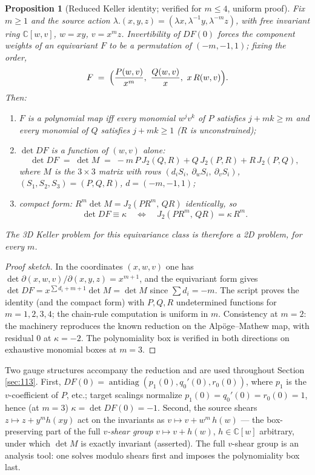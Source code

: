 \documentclass[11pt]{article}
\newtheorem{proposition}[theorem]{Proposition}
\theoremstyle{definition}
\theoremstyle{remark}
\newcommand{\C}{\mathbb{C}}
\DeclareMathOperator{\antidiag}{antidiag}
\begin{document}
\begin{proposition}[Reduced Keller identity; verified for $m\le 4$,
uniform proof]\label{prop:redw}
Fix $m \ge 1$ and the source action
$\lambda.(x,y,z) = (\lambda x, \lambda^{-1}y, \lambda^{-m}z)$, with free
invariant ring $\C[w,v]$, $w = xy$, $v = x^m z$. Invertibility of
$DF(0)$ forces the component weights of an equivariant $F$ to be a
permutation of $(-m,-1,1)$; fixing the order,
\[
F \;=\; \Bigl(\frac{P(w,v)}{x^{m}},\ \frac{Q(w,v)}{x},\ x\,R(w,v)\Bigr).
\]
Then:
\begin{enumerate}
\item $F$ is a polynomial map iff every monomial $w^jv^k$ of $P$
 satisfies $j + mk \ge m$ and every monomial of $Q$ satisfies
 $j + mk \ge 1$ ($R$ is unconstrained);
\item $\det DF$ is a function of $(w,v)$ alone:
 \[
 \det DF \;=\; \det M \;=\;
 -m\,P\,J_2(Q,R) + Q\,J_2(P,R) + R\,J_2(P,Q),
 \]
 where $M$ is the $3\times3$ matrix with rows
 $(d_iS_i,\ \partial_wS_i,\ \partial_vS_i)$,
 $(S_1,S_2,S_3) = (P,Q,R)$, $d = (-m,-1,1)$;
\item \emph{compact form:} $R^m \det M = J_2(P R^m,\, Q R)$
 identically, so
 \[
 \det DF \equiv \kappa
 \quad\Longleftrightarrow\quad
 J_2(P R^m,\, Q R) = \kappa\, R^m .
 \]
\end{enumerate}
The 3D Keller problem for this equivariance class is therefore a 2D
problem, for every $m$.
\end{proposition}

\begin{proof}[Proof sketch]
In the coordinates $(x,w,v)$ one has
$\det \partial(x,w,v)/\partial(x,y,z) = x^{m+1}$, and the equivariant
form gives $\det DF = x^{\sum d_i + m + 1}\det M = \det M$ since
$\sum d_i = -m$. The script proves the identity (and the compact form)
with $P,Q,R$ undetermined functions for $m = 1,2,3,4$; the chain-rule
computation is uniform in $m$. Consistency at $m=2$: the machinery
reproduces the known reduction on the Alp\"oge--Mathew map, with
residual $0$ at $\kappa = -2$. The polynomiality box is verified in both
directions on exhaustive monomial boxes at $m=3$.
\end{proof}

Two gauge structures accompany the reduction and are used throughout
Section \ref{sec:113}. First, $DF(0) = \antidiag(p_1(0), q_0'(0),
r_0(0))$, where $p_1$ is the $v$-coefficient of $P$, etc.; target
scalings normalize $p_1(0) = q_0'(0) = r_0(0) = 1$, hence (at $m=3$)
$\kappa = \det DF(0) = -1$. Second, the source shears
$z \mapsto z + y^m h(xy)$ act on the invariants as
$v \mapsto v + w^m\,h(w)$ --- the box-preserving part of the full
\emph{$v$-shear group} $v \mapsto v + h(w)$, $h \in \C[w]$ arbitrary,
under which $\det M$ is exactly invariant (asserted). The full $v$-shear
group is an analysis tool: one solves modulo shears first and imposes the
polynomiality box last.
\end{document}
